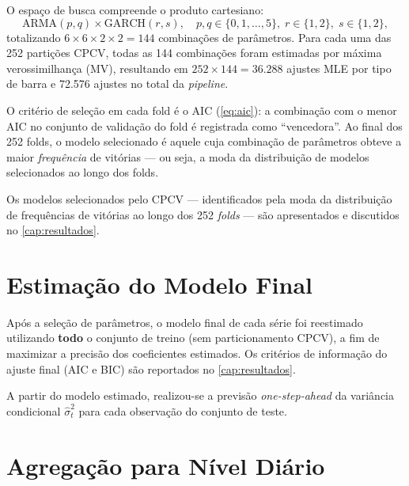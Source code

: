 O espaço de busca compreende o produto cartesiano:
%
\begin{equation}
    \label{eq:met_grid}
    \text{ARMA}(p, q) \times \text{GARCH}(r, s),
    \quad p, q \in \{0, 1, \ldots, 5\},\;
    r \in \{1, 2\},\;
    s \in \{1, 2\},
\end{equation}
%
totalizando $6 \times 6 \times 2 \times 2 = 144$ combinações de
parâmetros. Para cada uma das 252 partições CPCV, todas as 144
combinações foram estimadas por máxima verossimilhança (MV), resultando em
$252 \times 144 = 36.288$ ajustes MLE por tipo de barra e 72.576 ajustes
no total da \emph{pipeline}.

O critério de seleção em cada fold é o AIC
(\autoref{eq:aic}): a combinação com o menor AIC no
conjunto de validação do fold é registrada como ``vencedora''. Ao final dos
252 folds, o modelo selecionado é aquele cuja combinação de parâmetros
obteve a maior \emph{frequência} de vitórias --- ou seja, a moda da
distribuição de modelos selecionados ao longo dos folds.

Os modelos selecionados pelo CPCV --- identificados pela moda da
distribuição de frequências de vitórias ao longo dos 252 \emph{folds}
--- são apresentados e discutidos no \autoref{cap:resultados}.

\section{Estimação do Modelo Final}
\label{sec:met_estimacao}

Após a seleção de parâmetros, o modelo final de cada série foi
reestimado utilizando \textbf{todo} o conjunto de treino (sem
particionamento CPCV), a fim de maximizar a precisão dos coeficientes
estimados. Os critérios de informação do ajuste final (AIC e BIC) são
reportados no \autoref{cap:resultados}.

A partir do modelo estimado, realizou-se a previsão \emph{one-step-ahead}
da variância condicional $\hat{\sigma}_t^2$ para cada observação do
conjunto de teste.

\section{Agregação para Nível Diário}
\label{sec:met_agregacao}

